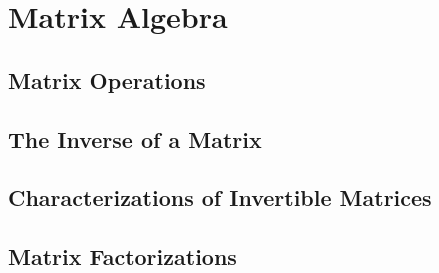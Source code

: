 \documentclass[../linalg.tex]{subfiles}
\begin{document}
\chapter{Matrix Algebra}
\section{Matrix Operations}
\section{The Inverse of a Matrix}
\section{Characterizations of Invertible Matrices}
\section{Matrix Factorizations}
\end{document}
